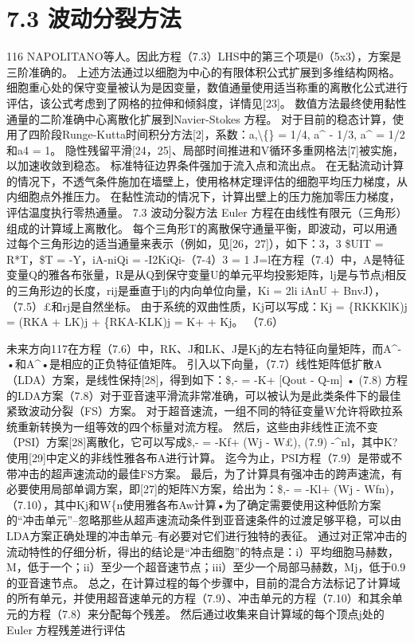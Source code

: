 \documentclass[UTF8,11pt,a4paper,openany,fontset=fandol]{ctexbook}
\begin{document}
\section{7.3 波动分裂方法}
116 NAPOLITANO等人。因此方程（7.3）LHS中的第三个项是0（5x3），方案是三阶准确的。 上述方法通过以细胞为中心的有限体积公式扩展到多维结构网格。 细胞重心处的保守变量被认为是因变量，数值通量使用适当称重的离散化公式进行评估，该公式考虑到了网格的拉伸和倾斜度，详情见[23]。 数值方法最终使用黏性通量的二阶准确中心离散化扩展到Navier-Stokes 方程。 对于目前的稳态计算，使用了四阶段Runge-Kutta时间积分方法[2]，系数：a,\textbackslash\{\} = 1/4, a\textasciicircum{} - 1/3, a\textasciicircum{} = 1/2和a4 = 1。 隐性残留平滑[24，25]、局部时间推进和V循环多重网格法[7]被实施，以加速收敛到稳态。 标准特征边界条件强加于流入点和流出点。 在无黏流动计算的情况下，不透气条件施加在墙壁上，使用格林定理评估的细胞平均压力梯度，从内细胞点外推压力。 在黏性流动的情况下，计算出壁上的压力施加零压力梯度，评估温度执行零热通量。 7.3 波动分裂方法 Euler 方程在由线性有限元（三角形）组成的计算域上离散化。 每个三角形T的离散保守通量平衡，即波动，可以用通过每个三角形边的适当通量来表示（例如，见[26，27]），如下：3，3 \$UIT = R*T，\$T = -Y，iA-niQi = -I2KiQi-（7-4）3 = 1 J=l在方程（7.4）中，A是特征变量Q的雅各布张量，R是从Q到保守变量U的单元平均投影矩阵，lj是与节点j相反的三角形边的长度，rij是垂直于lj的内向单位向量，Ki = 2li iAnU + BnvJ），（7.5）£和rj是自然坐标。 由于系统的双曲性质，Kj可以写成：Kj = \{RKKKlK)j = (RKA + LK)j + \{RKA-KLK)j = K+ + Kj。 （7.6）

未来方向117在方程（7.6）中，RK、J和LK、J是Kj的左右特征向量矩阵，而A\textasciicircum{}-•和A\textasciicircum{}•是相应的正负特征值矩阵。 引入以下向量，（7.7）线性矩阵低扩散A（LDA）方案，是线性保持[28]，得到如下：\$,- = -K+ [Qout - Q-m] • (7.8) 方程的LDA方案（7.8）对于亚音速平滑流非常准确，可以被认为是此类条件下的最佳紧致波动分裂（FS）方案。 对于超音速流，一组不同的特征变量W允许将欧拉系统重新转换为一组等效的四个标量对流方程。 然后，这些由非线性正流不变（PSI）方案[28]离散化，它可以写成\$,- = -Kf+ (Wj - W£), (7.9) -\textasciicircum{}nl，其中K? 使用[29]中定义的非线性雅各布A进行计算。 迄今为止，PSI方程（7.9）是带或不带冲击的超声速流动的最佳FS方案。 最后，为了计算具有强冲击的跨声速流，有必要使用局部单调方案，即[27]的矩阵N方案，给出为：\$,- = -Kl+ (Wj - Wfn)，（7.10），其中Kj和W\{n使用雅各布Aw计算•为了确定需要使用这种低阶方案的“冲击单元”--忽略那些从超声速流动条件到亚音速条件的过渡足够平稳，可以由LDA方案正确处理的冲击单元--有必要对它们进行独特的表征。 通过对正常冲击的流动特性的仔细分析，得出的结论是“冲击细胞”的特点是：i）平均细胞马赫数，M，低于一个；ii）至少一个超音速节点；iii）至少一个局部马赫数，Mj，低于0.9的亚音速节点。 总之，在计算过程的每个步骤中，目前的混合方法标记了计算域的所有单元，并使用超音速单元的方程（7.9）、冲击单元的方程（7.10）和其余单元的方程（7.8）来分配每个残差。 然后通过收集来自计算域的每个顶点j处的Euler 方程残差进行评估
\end{document}
